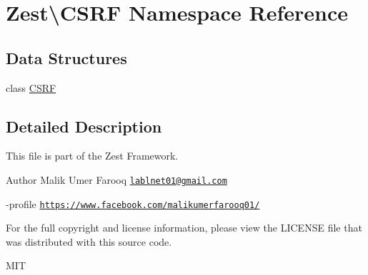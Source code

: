\hypertarget{namespace_zest_1_1_c_s_r_f}{}\section{Zest\textbackslash{}C\+S\+RF Namespace Reference}
\label{namespace_zest_1_1_c_s_r_f}
\subsection*{Data Structures}
\begin{DoxyCompactItemize}
\item 
class \mbox{\hyperlink{class_zest_1_1_c_s_r_f_1_1_c_s_r_f}{C\+S\+RF}}
\end{DoxyCompactItemize}


\subsection{Detailed Description}
This file is part of the Zest Framework.

\begin{DoxyAuthor}{Author}
Malik Umer Farooq \href{mailto:lablnet01@gmail.com}{\tt lablnet01@gmail.\+com} 

-\/profile \href{https://www.facebook.com/malikumerfarooq01/}{\tt https\+://www.\+facebook.\+com/malikumerfarooq01/}
\end{DoxyAuthor}
For the full copyright and license information, please view the L\+I\+C\+E\+N\+SE file that was distributed with this source code.

M\+IT 